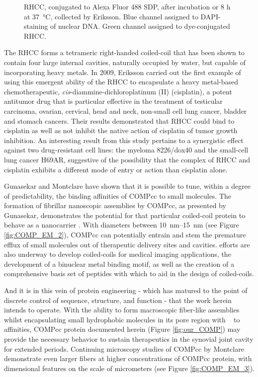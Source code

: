 \begin{refsection}
\begin{figure}[h!]
{        RHCC, conjugated to Alexa Fluor 488 SDP, after incubation or 8 h at
        \SI{37}{\celsius}, collected by Eriksson. Blue channel assigned to
        DAPI-staining of nuclear DNA. Green channel assigned to dye-conjugated
        RHCC.\cite{Eriksson2009}}\label{fig:coiled-coil_binding}
\end{figure}
The RHCC forms a tetrameric right-handed coiled-coil that has been shown to
contain four large internal cavities, naturally occupied by water, but capable
of incorporating heavy metals. In 2009, Eriksson  carried out the
first example of using this emergent ability of the RHCC to encapsulate a
heavy metal-based chemotherapeutic, \emph{cis}-diammine-dichloroplatinum (II)
(cisplatin), a potent antitumor drug that is particular effective in the
treatment of testicular carcinoma, ovarian, cervical, head and neck, 
non-small cell lung cancer, bladder and stomach cancers.\cite{Go1999} Their
results demonstrated that RHCC could bind to cisplatin as well as not inhibit
the native action of cisplatin of tumor growth inhibition. An interesting result
from this study pertains to a synergistic effect against two drug-resistant cell
lines: the myeloma 8226/dox40 and the small-cell lung cancer H69AR, suggestive
of the possibility that the complex of RHCC and cisplatin exhibits a different
mode of entry or action than cisplatin alone.

Gunasekar and Montclare have shown that it is possible to tune, within
a degree of predictability, the binding affinities of COMPcc to small
molecules.\cite{Gunasekar2009} The formation of fibrillar nanoscopic assemblies
by COMPcc, as presented by Gunasekar,\cite{Gunasekar2012}
demonstrates the potential for that particular coiled-coil protein to behave as
a nanocarrier .  With diameters between \SIrange{10}{15}{\nm}
(see Figure \ref{fig:COMP_EM_2}), COMPcc can potentially entrain
and stem the premature efflux of small molecules out of therapeutic delivery
sites and cavities.  efforts are also underway to develop
coiled-coils for medical imaging applications, the development of a binuclear
metal binding motif, as well as the creation of a comprehensive basis set of
peptides with which to aid in the design of 
coiled-coils.\cite{Shiga2012,Fletcher2012,Berwick2014}

And it is in this vein of protein engineering - which has matured to the point
of discrete control of sequence, structure, and function - that the work herein
intends to operate. With the ability to form macroscopic fiber-like assemblies
whilst encapsulating small hydrophobic molecules in its pore region with
\si{\micro\moLar} to \si{\nano\moLar} affinities,
COMPcc protein documented herein (Figure
\ref{fig:our_COMP}) may provide the necessary behavior to sustain therapeutics
in the synovial joint cavity for extended periods. Continuing microscopy studies
of COMPcc by Montclare demonstrate even larger fibers at higher
concentrations of COMPcc protein, with dimensional features on the scale of
micrometers (see Figure \ref{fig:COMP_EM_3}).


\end{refsection}
